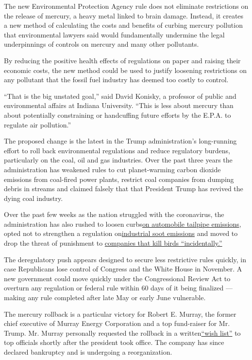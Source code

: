 The new Environmental Protection Agency rule does not eliminate
restrictions on the release of mercury, a heavy metal linked to brain
damage. Instead, it creates a new method of calculating the costs and
benefits of curbing mercury pollution that environmental lawyers said
would fundamentally undermine the legal underpinnings of controls on
mercury and many other pollutants.

By reducing the positive health effects of regulations on paper and
raising their economic costs, the new method could be used to justify
loosening restrictions on any pollutant that the fossil fuel industry
has deemed too costly to control.

``That is the big unstated goal,'' said David Konisky, a professor of
public and environmental affairs at Indiana University. ``This is less
about mercury than about potentially constraining or handcuffing future
efforts by the E.P.A. to regulate air pollution.''

The proposed change is the latest in the Trump administration's
long-running effort to roll back environmental regulations and reduce
regulatory burdens, particularly on the coal, oil and gas industries.
Over the past three years the administration has weakened rules to cut
planet-warming carbon dioxide emissions from coal-fired power plants,
restrict coal companies from dumping debris in streams and claimed
falsely that that President Trump has revived the dying coal industry.

Over the past few weeks as the nation struggled with the coronavirus,
the administration has also rushed to loosen
curbs\href{https://www.nytimes3xbfgragh.onion/2020/03/30/climate/trump-fuel-economy.html}{on
automobile tailpipe emissions}, opted not to strengthen a regulation
on\href{https://www.nytimes3xbfgragh.onion/2020/04/14/climate/coronavirus-soot-clean-air-regulations.html}{industrial
soot emissions} and moved to drop the threat of punishment to
\href{https://www.nytimes3xbfgragh.onion/2020/01/30/climate/trump-bird-deaths.html}{companies
that kill birds ``incidentally.''}

The deregulatory push appears designed to secure less restrictive rules
quickly, in case Republicans lose control of Congress and the White
House in November. A new government could move quickly under the
Congressional Review Act to overturn any regulation or federal rule
within 60 days of it being finalized --- making any rule completed after
late May or early June vulnerable.

The mercury rollback is a particular victory for Robert E. Murray, the
former chief executive of Murray Energy Corporation and a top
fund-raiser for Mr. Trump. Mr. Murray personally requested the rollback
in a
written\href{https://www.nytimes3xbfgragh.onion/2018/01/09/climate/coal-murray-trump-memo.html}{``wish
list''} to top officials shortly after the president took office. The
company has since declared bankruptcy and is undergoing a
reorganization.

